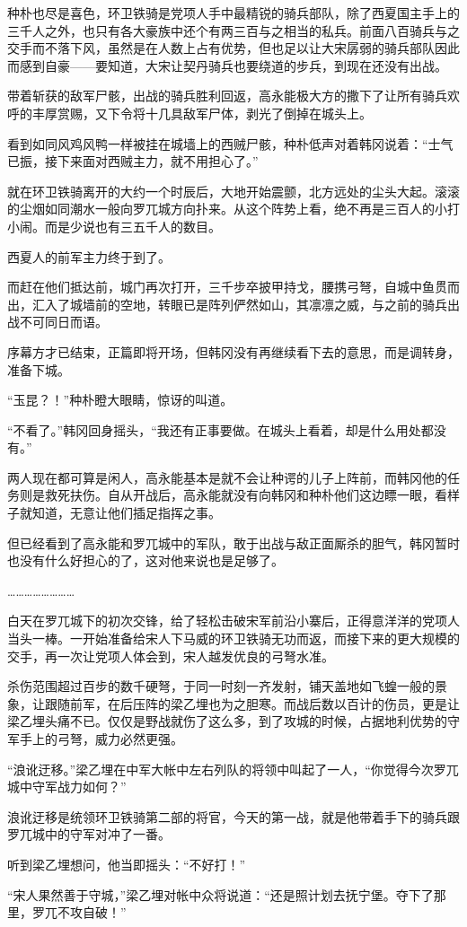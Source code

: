 种朴也尽是喜色，环卫铁骑是党项人手中最精锐的骑兵部队，除了西夏国主手上的三千人之外，也只有各大豪族中还个有两三百与之相当的私兵。前面八百骑兵与之交手而不落下风，虽然是在人数上占有优势，但也足以让大宋孱弱的骑兵部队因此而感到自豪——要知道，大宋让契丹骑兵也要绕道的步兵，到现在还没有出战。

带着斩获的敌军尸骸，出战的骑兵胜利回返，高永能极大方的撒下了让所有骑兵欢呼的丰厚赏赐，又下令将十几具敌军尸体，剥光了倒掉在城头上。

看到如同风鸡风鸭一样被挂在城墙上的西贼尸骸，种朴低声对着韩冈说着：“士气已振，接下来面对西贼主力，就不用担心了。”

就在环卫铁骑离开的大约一个时辰后，大地开始震颤，北方远处的尘头大起。滚滚的尘烟如同潮水一般向罗兀城方向扑来。从这个阵势上看，绝不再是三百人的小打小闹。而是少说也有三五千人的数目。

西夏人的前军主力终于到了。

而赶在他们抵达前，城门再次打开，三千步卒披甲持戈，腰携弓弩，自城中鱼贯而出，汇入了城墙前的空地，转眼已是阵列俨然如山，其凛凛之威，与之前的骑兵出战不可同日而语。

序幕方才已结束，正篇即将开场，但韩冈没有再继续看下去的意思，而是调转身，准备下城。

“玉昆？！”种朴瞪大眼睛，惊讶的叫道。

“不看了。”韩冈回身摇头，“我还有正事要做。在城头上看着，却是什么用处都没有。”

两人现在都可算是闲人，高永能基本是就不会让种谔的儿子上阵前，而韩冈他的任务则是救死扶伤。自从开战后，高永能就没有向韩冈和种朴他们这边瞟一眼，看样子就知道，无意让他们插足指挥之事。

但已经看到了高永能和罗兀城中的军队，敢于出战与敌正面厮杀的胆气，韩冈暂时也没有什么好担心的了，这对他来说也是足够了。

……………………

白天在罗兀城下的初次交锋，给了轻松击破宋军前沿小寨后，正得意洋洋的党项人当头一棒。一开始准备给宋人下马威的环卫铁骑无功而返，而接下来的更大规模的交手，再一次让党项人体会到，宋人越发优良的弓弩水准。

杀伤范围超过百步的数千硬弩，于同一时刻一齐发射，铺天盖地如飞蝗一般的景象，让跟随前军，在后压阵的梁乙埋也为之胆寒。而战后数以百计的伤员，更是让梁乙埋头痛不已。仅仅是野战就伤了这么多，到了攻城的时候，占据地利优势的守军手上的弓弩，威力必然更强。

“浪讹迂移。”梁乙埋在中军大帐中左右列队的将领中叫起了一人，“你觉得今次罗兀城中守军战力如何？”

浪讹迂移是统领环卫铁骑第二部的将官，今天的第一战，就是他带着手下的骑兵跟罗兀城中的守军对冲了一番。

听到梁乙埋想问，他当即摇头：“不好打！”

“宋人果然善于守城，”梁乙埋对帐中众将说道：“还是照计划去抚宁堡。夺下了那里，罗兀不攻自破！”

